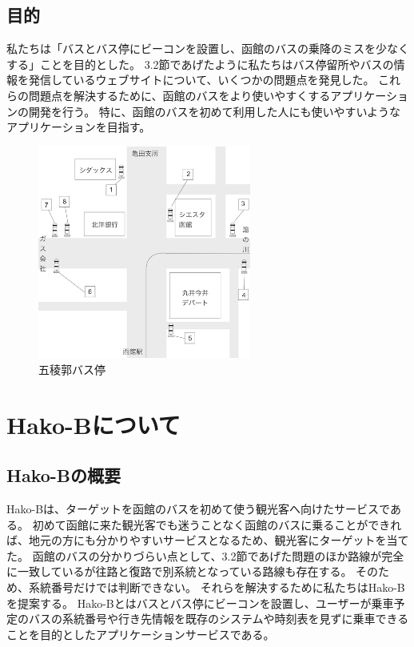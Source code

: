 \documentclass[openany,11pt,papersize]{jsbook}
\begin{document}
\section{目的}\label{sec:gaiyou}
私たちは「バスとバス停にビーコンを設置し、函館のバスの乗降のミスを少なくする」ことを目的とした。
3.2節であげたように私たちはバス停留所やバスの情報を発信しているウェブサイトについて、いくつかの問題点を発見した。
これらの問題点を解決するために、函館のバスをより使いやすくするアプリケーションの開発を行う。
特に、函館のバスを初めて利用した人にも使いやすいようなアプリケーションを目指す。


\begin{figure}[htbp]
  \begin{center}
    \includegraphics[clip,width=7.0cm]{img/14007.png}
    \caption{五稜郭バス停}
    \label{fig:goryo}
  \end{center}
\end{figure}

\chapter{Hako-Bについて}

\section{Hako-Bの概要}
Hako-Bは、ターゲットを函館のバスを初めて使う観光客へ向けたサービスである。
初めて函館に来た観光客でも迷うことなく函館のバスに乗ることができれば、地元の方にも分かりやすいサービスとなるため、観光客にターゲットを当てた。
函館のバスの分かりづらい点として、3.2節であげた問題のほか路線が完全に一致しているが往路と復路で別系統となっている路線も存在する。
そのため、系統番号だけでは判断できない。
それらを解決するために私たちはHako-Bを提案する。
Hako-Bとはバスとバス停にビーコンを設置し、ユーザーが乗車予定のバスの系統番号や行き先情報を既存のシステムや時刻表を見ずに乗車できることを目的としたアプリケーションサービスである。
\end{document}
